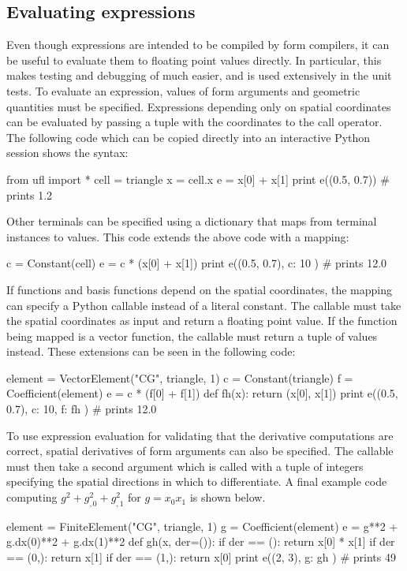 \subsection{Evaluating expressions}
\label{ufl:sec:evaluating}

Even though \ufl{} expressions are intended to be compiled by form
compilers, it can be useful to evaluate them to floating point values
directly. In particular, this makes testing and debugging of \ufl{}
much easier, and is used extensively in the unit tests.  To evaluate an
\ufl{} expression, values of form arguments and geometric quantities
must be specified.  Expressions depending only on spatial coordinates
can be evaluated by passing a tuple with the coordinates to the call
operator. The following code which can be copied directly into an
interactive Python session shows the syntax:
\begin{python}
from ufl import *
cell = triangle
x = cell.x
e = x[0] + x[1]
print e((0.5, 0.7)) # prints 1.2
\end{python}
Other terminals can be specified using a dictionary that maps from
terminal instances to values.  This code extends the above code with
a mapping:
\begin{python}
c = Constant(cell)
e = c * (x[0] + x[1])
print e((0.5, 0.7), { c: 10 }) # prints 12.0
\end{python}
If functions and basis functions depend on the spatial coordinates, the
mapping can specify a Python callable instead of a literal constant.
The callable must take the spatial coordinates as input and return a
floating point value.  If the function being mapped is a vector function,
the callable must return a tuple of values instead.  These extensions
can be seen in the following code:
\begin{python}
element = VectorElement("CG", triangle, 1)
c = Constant(triangle)
f = Coefficient(element)
e = c * (f[0] + f[1])
def fh(x):
    return (x[0], x[1])
print e((0.5, 0.7), { c: 10, f: fh }) # prints 12.0
\end{python}
To use expression evaluation for validating that the derivative
computations are correct, spatial derivatives of form arguments can
also be specified.  The callable must then take a second argument which
is called with a tuple of integers specifying the spatial directions in
which to differentiate. A final example code computing $g^2 + g_{,0}^2 +
g_{,1}^2$ for $g=x_0x_1$ is shown below.
\begin{python}
element = FiniteElement("CG", triangle, 1)
g = Coefficient(element)
e = g**2 + g.dx(0)**2 + g.dx(1)**2
def gh(x, der=()):
    if der == ():   return x[0] * x[1]
    if der == (0,): return x[1]
    if der == (1,): return x[0]
print e((2, 3), { g: gh }) # prints 49
\end{python}

